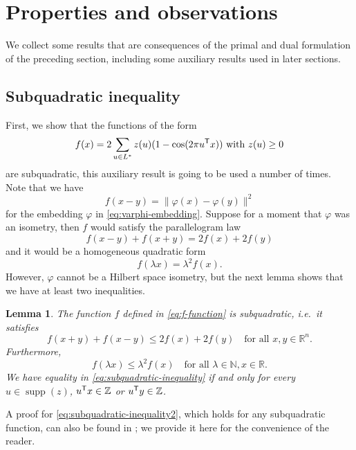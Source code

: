 \documentclass{amsart}
\newtheorem{lemma}[defin]{Lemma}
\newcommand{\R}{\mathbb{R}}
\newcommand{\Z}{\mathbb{Z}}
\newcommand{\N}{\mathbb{N}}
\DeclareMathOperator{\supp}{supp}
\begin{document}
%
%
%

\section{Properties and observations}
\label{sec:properties}

We collect some results that are consequences of the primal and dual
formulation of the preceding section, including some auxiliary results
used in later sections.

\subsection{Subquadratic inequality}

First, we show that the functions of the form
\begin{equation}
\label{eq:f-function}
  f(x) = 2 \sum_{u \in L^*} z(u) (1 - \cos(2\pi u^{\sf T} x)) \text{
    with } z(u) \geq 0
\end{equation}
are subquadratic, this auxiliary result is going to be used a number of times. Note that we have
\[
  f(x-y) = \|\varphi(x) - \varphi(y)\|^2
\]
for the embedding $\varphi$ in \eqref{eq:varphi-embedding}. Suppose
for a moment that $\varphi$ was an
isometry, then $f$ would satisfy the parallelogram law
\[
  f(x-y) + f(x+y) = 2 f(x) + 2 f(y)
\]
and it would be a homogeneous quadratic form
\[
  f(\lambda x) = \lambda^2 f(x).
\]
However, $\varphi$ cannot be a Hilbert space isometry, but the next
lemma shows that we have at least two inequalities.

\begin{lemma}
  \label{lemma:sub1}
  The function $f$ defined in \eqref{eq:f-function} is subquadratic, i.e.\ it
  satisfies
  \begin{equation}
\label{eq:subquadratic-inequality}
 f(x+y) + f(x-y) \leq 2f(x) + 2f(y) \quad \text{for all } x,y\in \R^n.
\end{equation}
Furthermore,
\begin{equation}
  \label{eq:subquadratic-inequality2}
    f(\lambda x) \le \lambda^2f(x) \quad  \text{for all } \lambda \in
    \N, x\in \R.
\end{equation}
We have equality in \eqref{eq:subquadratic-inequality} if and only for every $u \in \supp(z)$, $u^{\sf T}x \in \Z$ or $u^{\sf T} y \in \Z$.
\end{lemma}

A proof for \eqref{eq:subquadratic-inequality2}, which holds for any subquadratic function, can also be found in
\cite{Kominek2006a}; we provide it here for the convenience of the
reader.
\end{document}
